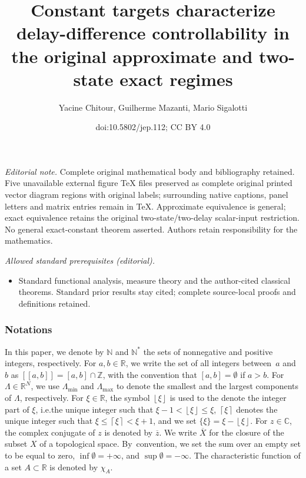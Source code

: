 \documentclass[10pt]{amsart}
\title{Constant targets characterize delay-difference controllability in the original approximate and two-state exact regimes}
\author{Yacine Chitour, Guilherme Mazanti, Mario Sigalotti}
\date{doi:10.5802/jep.112; CC BY 4.0}
\newcommand{\llbracket}{[\![}
\newcommand{\rrbracket}{]\!]}
\theoremstyle{plain}
\theoremstyle{definition}
\newcommand{\floor}[1]{\left\lfloor #1 \right\rfloor}
\newcommand{\ceil}[1]{\left\lceil #1 \right\rceil}
\providecommand{\ie}{i.e.}\providecommand{\etc}{etc.}\providecommand{\resp}{resp.}\providecommand{\cf}{cf.}
\providecommand{\mainmatter}{}\providecommand{\backmatter}{}
\begin{document}
\maketitle
\noindent\textit{Editorial note.} Complete original mathematical body and bibliography retained. Five unavailable external figure TeX files preserved as complete original printed vector diagram regions with original labels; surrounding native captions, panel letters and matrix entries remain in TeX. Approximate equivalence is general; exact equivalence retains the original two-state/two-delay scalar-input restriction. No general exact-constant theorem asserted. Authors retain responsibility for the mathematics.\par\medskip
\noindent\textit{Allowed standard prerequisites (editorial).}\begin{itemize}
\item Standard functional analysis, measure theory and the author-cited classical theorems. Standard prior results stay cited; complete source-local proofs and definitions retained.
\end{itemize}\medskip
\newpage
\tableofcontents
\mainmatter
\vspace*{-2\baselineskip}
\subsubsection*{Notations}

In this paper, we denote by $\mathbb N$ and $\mathbb N^\ast$ the sets of nonnegative and positive integers, respectively. For $a, b \in \mathbb R$, we write the set of all integers between~$a$ and~$b$ as $\llbracket a, b \rrbracket = [a, b] \cap \mathbb Z$, with the convention that $[a, b] = \emptyset$ if $a > b$. For \hbox{$\Lambda \in \mathbb R^N$}, we use $\Lambda_{\min}$ and $\Lambda_{\max}$ to denote the smallest and the largest components of $\Lambda$, respec\-tively. For $\xi \in \mathbb R$, the symbol $\floor{\xi}$ is used to the denote the integer part of $\xi$, \ie the unique integer such that $\xi - 1 < \floor{\xi} \leq \xi$, $\ceil{\xi}$ denotes the unique integer such that $\xi \leq \ceil{\xi} < \xi + 1$, and we set $\{\xi\} = \xi - \floor{\xi}$. For $z \in \mathbb C$, the complex conjugate of $z$ is denoted by $\overline z$. We write $\overline X$ for the closure of the subset $X$ of a topological space. By~convention, we set the sum over an empty set to be equal to zero, $\inf\emptyset = +\infty$, and $\sup\emptyset = -\infty$. The characteristic function of a set $A \subset \mathbb R$ is denoted by $\chi_A$.
\end{document}
